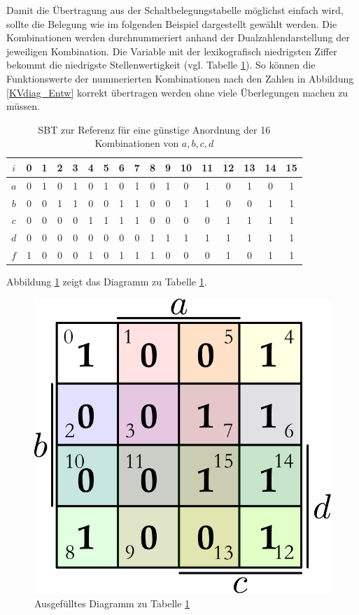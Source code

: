\documentclass[11pt,a4paper]{scrreprt}
\begin{document}
Damit die Übertragung aus der Schaltbelegungstabelle möglichst einfach wird, sollte die Belegung wie im folgenden Beispiel dargestellt gewählt werden. Die Kombinationen werden durchnummeriert anhand der Dualzahlendarstellung der jeweiligen Kombination. Die Variable mit der lexikografisch niedrigsten Ziffer bekommt die niedrigste Stellenwertigkeit (vgl. Tabelle \ref{SBT_bsp}). So können die Funktionswerte der nummerierten Kombinationen nach den Zahlen in Abbildung \ref{KVdiag_Entw} korrekt übertragen werden ohne viele Überlegungen machen zu müssen. 

\begin{table}
\centering
	\begin{tabular}[htbp]{c*{16}{c}}
		$i$ & 0 & 1 & 2 & 3 & 4 & 5 & 6 & 7 & 8 & 9 &10 &11 &12 &13 &14 &15 \\ \hline
		$a$ & 0 & 1 & 0 & 1 & 0 & 1 & 0 & 1 & 0 & 1 & 0 & 1 & 0 & 1 & 0 & 1 \\ 
		$b$ & 0 & 0 & 1 & 1 & 0 & 0 & 1 & 1 & 0 & 0 & 1 & 1 & 0 & 0 & 1 & 1 \\
		$c$ & 0 & 0 & 0 & 0 & 1 & 1 & 1 & 1 & 0 & 0 & 0 & 0 & 1 & 1 & 1 & 1 \\
		$d$ & 0 & 0 & 0 & 0 & 0 & 0 & 0 & 0 & 1 & 1 & 1 & 1 & 1 & 1 & 1 & 1 \\ \hline
		$f$ & 1 & 0 & 0 & 0 & 1 & 0 & 1 & 1 & 1 & 0 & 0 & 0 & 1 & 0 & 1 & 1 \\
	\end{tabular}
\caption{SBT zur Referenz für eine günstige Anordnung der 16 Kombinationen von $a, b, c, d$}
\label{SBT_bsp}
\end{table}

Abbildung \ref{KVdiag_bsp_ausgefuellt} zeigt das Diagramm zu Tabelle \ref{SBT_bsp}.
\begin{figure}[htbp] %
	\centering
	\includegraphics[scale = 0.5]{KVdiagramm_KVdiagramm_abcd_ausgefuellt.pdf}
	\caption{Ausgefülltes Diagramm zu Tabelle \ref{SBT_bsp}}
	\label{KVdiag_bsp_ausgefuellt}
\end{figure}
\end{document}
